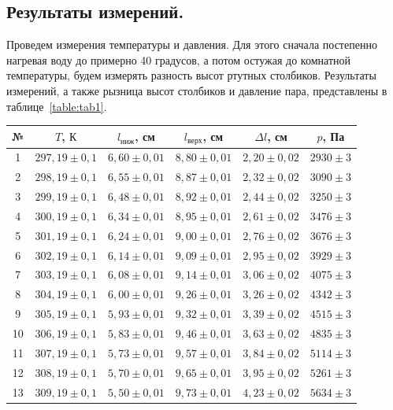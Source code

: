 \documentclass[a4paper,11pt]{article}
\begin{document}
\subsection{Результаты измерений.}
Проведем измерения температуры и давления. Для этого сначала постепенно нагревая воду до примерно 40 градусов, а потом остужая до комнатной температуры, будем измерять разность высот ртутных столбиков. Результаты измерений, а также рызница высот столбиков и давление пара, представлены в таблице~\ref{table:tab1}.
\begin{table}[h!]
\centering
\begin{tabular}{ ||c|c|c|c|c|c|| }
  \hline
  №  & $T$, $К$  & $l_{ниж}$, см   & $l_{верх}$, см    & $\Delta l$, см  & $p$, Па \\
  \hline
  1  & $297,19 \pm 0,1$ & $6,60 \pm 0,01$ & $8,80 \pm 0,01$  & $2,20 \pm 0,02$ & $2930 \pm 3$ \\
  2  & $298,19 \pm 0,1$ & $6,55 \pm 0,01$ & $8,87 \pm 0,01$  & $2,32 \pm 0,02$ & $3090 \pm 3$ \\
  3  & $299,19 \pm 0,1$ & $6,48 \pm 0,01$ & $8,92 \pm 0,01$  & $2,44 \pm 0,02$ & $3250 \pm 3$ \\
  4  & $300,19 \pm 0,1$ & $6,34 \pm 0,01$ & $8,95 \pm 0,01$  & $2,61 \pm 0,02$ & $3476 \pm 3$ \\
  5  & $301,19 \pm 0,1$ & $6,24 \pm 0,01$ & $9,00 \pm 0,01$  & $2,76 \pm 0,02$ & $3676 \pm 3$ \\
  6  & $302,19 \pm 0,1$ & $6,14 \pm 0,01$ & $9,09 \pm 0,01$  & $2,95 \pm 0,02$ & $3929 \pm 3$ \\
  7  & $303,19 \pm 0,1$ & $6,08 \pm 0,01$ & $9,14 \pm 0,01$  & $3,06 \pm 0,02$ & $4075 \pm 3$ \\
  8  & $304,19 \pm 0,1$ & $6,00 \pm 0,01$ & $9,26 \pm 0,01$  & $3,26 \pm 0,02$ & $4342 \pm 3$ \\
  9  & $305,19 \pm 0,1$ & $5,93 \pm 0,01$ & $9,32 \pm 0,01$  & $3,39 \pm 0,02$ & $4515 \pm 3$ \\
  10 & $306,19 \pm 0,1$ & $5,83 \pm 0,01$ & $9,46 \pm 0,01$  & $3,63 \pm 0,02$ & $4835 \pm 3$ \\
  11 & $307,19 \pm 0,1$ & $5,73 \pm 0,01$ & $9,57 \pm 0,01$  & $3,84 \pm 0,02$ & $5114 \pm 3$ \\
  12 & $308,19 \pm 0,1$ & $5,70 \pm 0,01$ & $9,65 \pm 0,01$  & $3,95 \pm 0,02$ & $5261 \pm 3$ \\
  13 & $309,19 \pm 0,1$ & $5,50 \pm 0,01$ & $9,73 \pm 0,01$  & $4,23 \pm 0,02$ & $5634 \pm 3$ \\

\end{tabular}
\end{table}
\end{document}
